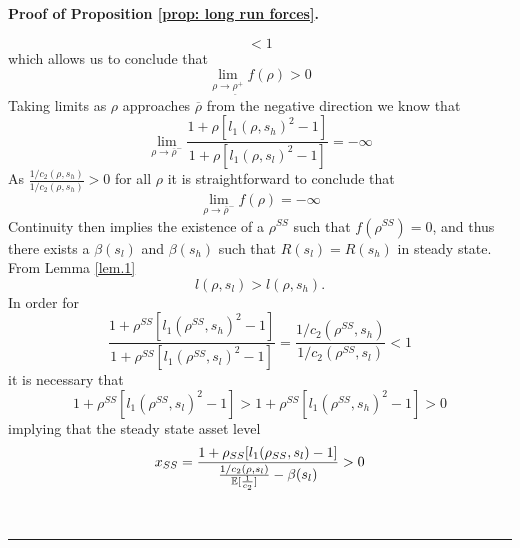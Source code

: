 \documentclass[thmsb,11pt]{article}
\newenvironment{proof}[1][Proof]{\noindent \textbf{#1.} }{\  \rule{0.5em}{0.5em}}
\begin{document}
\begin{appendix}
\begin{proof}[Proof of Proposition \ref{prop: long run forces}]
\begin{description}
\begin{equation*}
< 1
\end{equation*}
which allows us to conclude that
\begin{equation*}
\lim_{\rho\rightarrow\underline\rho^+} f(\rho) > 0
\end{equation*}
Taking limits as $\rho$ approaches $\overline\rho$ from the negative
direction we know that
\begin{equation*}
\lim_{\rho\rightarrow\overline\rho^-}\frac{1+\rho[l_1(\rho,s_h)^2-1]}{1+\rho[%
l_1(\rho,s_l)^2-1]} = -\infty
\end{equation*}
As $\frac{1/c_2(\rho,s_h)}{1/c_2(\rho,s_h)} > 0$ for all $\rho$ it is
straightforward to conclude that
\begin{equation*}
\lim_{\rho\rightarrow\overline\rho^-} f(\rho) = -\infty
\end{equation*}
Continuity then implies the existence of a $\rho^{SS}$ such that $%
f(\rho^{SS}) = 0$, and thus there exists a $\beta(s_l)$ and $\beta(s_h)$
such that $R(s_l) = R(s_h)$ in steady state. From Lemma \ref{lem.1}
\begin{equation*}
l(\rho,s_l) > l(\rho,s_h).
\end{equation*}
In order for
\begin{equation*}
\frac{1+\rho^{SS}[l_1(\rho^{SS},s_h)^2-1]}{1+\rho^{SS}[l_1(%
\rho^{SS},s_l)^2-1]} = \frac{1/c_2(\rho^{SS},s_h)}{1/c_2(\rho^{SS},s_l)} < 1
\end{equation*}
it is necessary that
\begin{equation*}
1+\rho^{SS}[l_1(\rho^{SS},s_l)^2-1] > 1+\rho^{SS}[l_1(\rho^{SS},s_h)^2-1] > 0
\end{equation*}
implying that the steady state asset level
\begin{equation*}
x_{SS} = \frac{1+\rho_{SS}[l_1(\rho_{SS},s_l)-1]}{\frac{1/c_2(\rho,s_l)}{%
\mathbb{E}[\frac1{c_2}]}-\beta(s_l)} >0
\end{equation*}


\end{description}
\end{proof}
\end{appendix}
\end{document}
